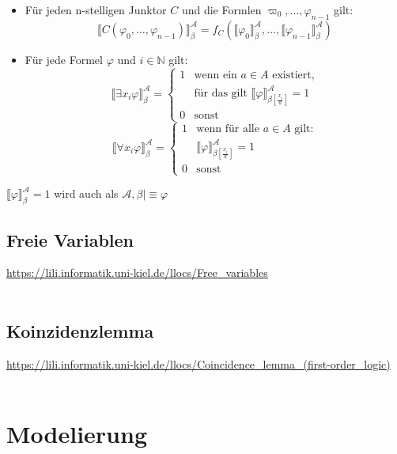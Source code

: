 \documentclass[twocolumn]{article}
\newcommand{\model}{\mathrel{{\vert}\!{\equiv}}}
\begin{document}
    \begin{itemize}
        \item Für jeden n-stelligen Junktor $C$ und die Formlen $\varpi_0,...,\varphi_{n-1}$ gilt:
            $$ \llbracket C (\varphi_0,\dots,\varphi_{n-1})\rrbracket_{\beta}^{\mathcal A} = f_C(\llbracket \varphi_0 \rrbracket_{\beta}^{\mathcal A}, \dots,\llbracket \varphi_{n-1} \rrbracket_{\beta}^{\mathcal A}) $$
        \item Für jede Formel $\varphi$ und $i \in \mathbb N$ gilt:
            $$ \llbracket \exists x_i \varphi \rrbracket_{\beta}^{\mathcal A} = 
            \begin{cases}
                1 & \text{wenn ein } a \in A \text{ existiert,} \\ & \text{für das gilt } \llbracket \varphi \rrbracket_{\beta [\frac{x_i}{a}]}^{\mathcal A} = 1\\
                0 & \text{sonst}
            \end{cases}$$
            $$ \llbracket \forall x_i \varphi \rrbracket_{\beta}^{\mathcal A} = 
            \begin{cases}
                1 & \text{wenn für alle } a \in A \text{ gilt:} \\ &  \llbracket \varphi \rrbracket_{\beta [\frac{x_i}{a}]}^{\mathcal A} = 1\\
                0 & \text{sonst}
            \end{cases}$$
    \end{itemize}
    $ \llbracket \varphi \rrbracket_{\beta}^{\mathcal A} = 1$ wird auch als $\mathcal A, \beta \model \varphi$

    \subsection{Freie Variablen}
    \url{https://lili.informatik.uni-kiel.de/llocs/Free_variables}\\\\

    \subsection{Koinzidenzlemma}
    \url{https://lili.informatik.uni-kiel.de/llocs/Coincidence_lemma_(first-order_logic)}\\\\

    \section{Modelierung}
\end{document}
